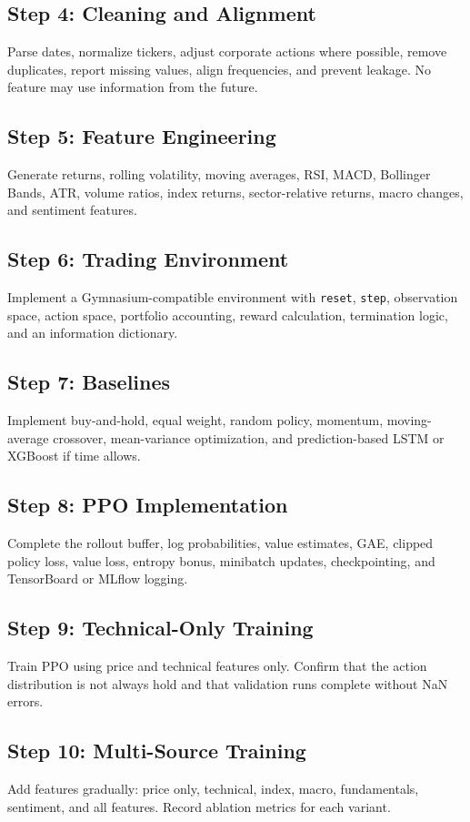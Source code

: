 \documentclass[11pt]{article}
\begin{document}
\subsection{Step 4: Cleaning and Alignment}
Parse dates, normalize tickers, adjust corporate actions where possible, remove duplicates, report missing values, align frequencies, and prevent leakage. No feature may use information from the future.

\subsection{Step 5: Feature Engineering}
Generate returns, rolling volatility, moving averages, RSI, MACD, Bollinger Bands, ATR, volume ratios, index returns, sector-relative returns, macro changes, and sentiment features.

\subsection{Step 6: Trading Environment}
Implement a Gymnasium-compatible environment with \texttt{reset}, \texttt{step}, observation space, action space, portfolio accounting, reward calculation, termination logic, and an information dictionary.

\subsection{Step 7: Baselines}
Implement buy-and-hold, equal weight, random policy, momentum, moving-average crossover, mean-variance optimization, and prediction-based LSTM or XGBoost if time allows.

\subsection{Step 8: PPO Implementation}
Complete the rollout buffer, log probabilities, value estimates, GAE, clipped policy loss, value loss, entropy bonus, minibatch updates, checkpointing, and TensorBoard or MLflow logging.

\subsection{Step 9: Technical-Only Training}
Train PPO using price and technical features only. Confirm that the action distribution is not always hold and that validation runs complete without NaN errors.

\subsection{Step 10: Multi-Source Training}
Add features gradually: price only, technical, index, macro, fundamentals, sentiment, and all features. Record ablation metrics for each variant.
\end{document}
